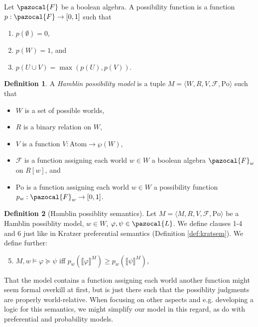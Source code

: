 \documentclass{article}
\theoremstyle{definition}
\newtheorem{definition}{Definition}
\renewcommand{\L}{\pazocal{L}}
\newcommand{\F}{\pazocal{F}}
\newcommand{\lb}{\llbracket}
\newcommand{\rb}{\rrbracket}
\newcommand{\Po}{\text{Po}}
\begin{document}
\noindent Let $\F$ be a boolean algebra. A possibility function is a function $p: \F \rightarrow [0,1]$ such that
\begin{enumerate}[nosep]
  \item $p(\emptyset) = 0$,
  \item $p(W) = 1$, and
  \item $p(U \cup V) = \max(p(U),p(V))$.
\end{enumerate}
\begin{definition}
    A \emph{Hamblin possibility model} is a tuple $M = \langle W,R,V,\mathcal{F},\Po\rangle$ such that
    \begin{itemize}[nosep]
        \renewcommand\labelitemi{--}
      \item $W$ is a set of possible worlds,
      \item $R$ is a binary relation on $W$,
        \item $V$ is a function $V: \text{Atom} \rightarrow \wp(W)$,
        \item $\mathcal{F}$ is a function assigning each world $w \in W$ a boolean algebra $\F_w$ on $R[w]$, and 
          \item $\Po$ is a function assigning each world $w \in W$ a possibility function \\ $p_w: \F_w \rightarrow [0,1]$.
    \end{itemize}
\end{definition}

\begin{definition}[Hamblin possiblity semantics]
    \label{def:hambsem}
    Let $M = \langle M,R,V,\mathcal{F},\Po \rangle$ be a Hamblin possiblity model, $w \in W$, $\varphi, \psi \in \L$. We define clauses 1-4 and 6 just like in Kratzer preferential semantics (Definition \ref{def:kratsem}). We define further:
    \begin{enumerate}[nosep]
  \setcounter{enumi}{4}
      \item $M,w \models \varphi \succeq \psi$ iff $p_w(\lb \varphi \rb^M) \geq p_w(\lb \psi \rb^M) $,
  \setcounter{enumi}{6}
    \end{enumerate}
\end{definition}
That the model contains a function assigning each world another function might seem formal overkill at first, but is just there such that the possiblity judgments are properly world-relative. When focusing on other aspects and e.g. developing a logic for this semantics, we might simplify our model in this regard, as \textcite{harrison-trainor17_prefer} do with preferential and probability models. 
\end{document}
